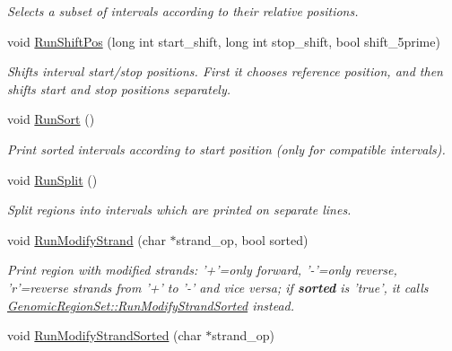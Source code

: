 \begin{CompactItemize}
\begin{CompactList}\small\item\em Selects a subset of intervals according to their relative positions. \item\end{CompactList}\item 
void \hyperlink{classGenomicRegionSet_d4b42becffb21de5e89129476c79c851}{RunShiftPos} (long int start\_\-shift, long int stop\_\-shift, bool shift\_\-5prime)
\begin{CompactList}\small\item\em Shifts interval start/stop positions. First it chooses reference position, and then shifts start and stop positions separately. \item\end{CompactList}\item 
\hypertarget{classGenomicRegionSet_53143cb3271c65fb289faece622cd8bd}{
void \hyperlink{classGenomicRegionSet_53143cb3271c65fb289faece622cd8bd}{RunSort} ()}
\label{classGenomicRegionSet_53143cb3271c65fb289faece622cd8bd}

\begin{CompactList}\small\item\em Print sorted intervals according to start position (only for compatible intervals). \item\end{CompactList}\item 
\hypertarget{classGenomicRegionSet_570e56362af1b30e7f5cb149ea42e54e}{
void \hyperlink{classGenomicRegionSet_570e56362af1b30e7f5cb149ea42e54e}{RunSplit} ()}
\label{classGenomicRegionSet_570e56362af1b30e7f5cb149ea42e54e}

\begin{CompactList}\small\item\em Split regions into intervals which are printed on separate lines. \item\end{CompactList}\item 
\hypertarget{classGenomicRegionSet_f1146729843b82d7637e0adc1b07e51a}{
void \hyperlink{classGenomicRegionSet_f1146729843b82d7637e0adc1b07e51a}{RunModifyStrand} (char $\ast$strand\_\-op, bool sorted)}
\label{classGenomicRegionSet_f1146729843b82d7637e0adc1b07e51a}

\begin{CompactList}\small\item\em Print region with modified strands: '+'=only forward, '-'=only reverse, 'r'=reverse strands from '+' to '-' and vice versa; if {\bf sorted} is 'true', it calls \hyperlink{classGenomicRegionSet_7c0a328896b88a0c837f60e89fd85584}{GenomicRegionSet::RunModifyStrandSorted} instead. \item\end{CompactList}\item 
\hypertarget{classGenomicRegionSet_7c0a328896b88a0c837f60e89fd85584}{
void \hyperlink{classGenomicRegionSet_7c0a328896b88a0c837f60e89fd85584}{RunModifyStrandSorted} (char $\ast$strand\_\-op)}
\label{classGenomicRegionSet_7c0a328896b88a0c837f60e89fd85584}


\end{CompactItemize}
